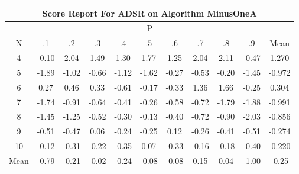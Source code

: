 \documentclass[11pt,a4paper]{report}
\begin{document}
\begin{longtable}{ | c || c | c | c | c | c | c | c | c | c || c |}
\hline
\multicolumn{11}{|c|}{ Score Report For ADSR on Algorithm MinusOneA} \\
\hline
\multicolumn{11}{|c|}{ P } \\
\hline
N & .1 & .2 & .3 & .4 & .5 & .6 & .7 & .8 & .9 & Mean\\
 \hline
 \hline
 \endhead
  4 &  \cellcolor[HTML]{FFFFFF} -0.10 &  \cellcolor[HTML]{CFCFFF} 2.04 &  \cellcolor[HTML]{D7D7FF} 1.49 &  \cellcolor[HTML]{DFDFFF} 1.30 &  \cellcolor[HTML]{CFCFFF} 1.77 &  \cellcolor[HTML]{DFDFFF} 1.25 &  \cellcolor[HTML]{CFCFFF} 2.04 &  \cellcolor[HTML]{C7C7FF} 2.11 &  \cellcolor[HTML]{FFF7F7} -0.47 & 1.270 \\
  5 &  \cellcolor[HTML]{FFCFCF} -1.89 &  \cellcolor[HTML]{FFE7E7} -1.02 &  \cellcolor[HTML]{FFEFEF} -0.66 &  \cellcolor[HTML]{FFDFDF} -1.12 &  \cellcolor[HTML]{FFD7D7} -1.62 &  \cellcolor[HTML]{FFF7F7} -0.27 &  \cellcolor[HTML]{FFEFEF} -0.53 &  \cellcolor[HTML]{FFF7F7} -0.20 &  \cellcolor[HTML]{FFD7D7} -1.45 & -0.972 \\
  6 &  \cellcolor[HTML]{F7F7FF} 0.27 &  \cellcolor[HTML]{F7F7FF} 0.46 &  \cellcolor[HTML]{F7F7FF} 0.33 &  \cellcolor[HTML]{FFEFEF} -0.61 &  \cellcolor[HTML]{FFF7F7} -0.17 &  \cellcolor[HTML]{FFF7F7} -0.33 &  \cellcolor[HTML]{DFDFFF} 1.36 &  \cellcolor[HTML]{D7D7FF} 1.66 &  \cellcolor[HTML]{FFF7F7} -0.25 & 0.304 \\
  7 &  \cellcolor[HTML]{FFD7D7} -1.74 &  \cellcolor[HTML]{FFE7E7} -0.91 &  \cellcolor[HTML]{FFEFEF} -0.64 &  \cellcolor[HTML]{FFF7F7} -0.41 &  \cellcolor[HTML]{FFF7F7} -0.26 &  \cellcolor[HTML]{FFEFEF} -0.58 &  \cellcolor[HTML]{FFEFEF} -0.72 &  \cellcolor[HTML]{FFCFCF} -1.79 &  \cellcolor[HTML]{FFCFCF} -1.88 & -0.991 \\
  8 &  \cellcolor[HTML]{FFD7D7} -1.45 &  \cellcolor[HTML]{FFDFDF} -1.25 &  \cellcolor[HTML]{FFEFEF} -0.52 &  \cellcolor[HTML]{FFF7F7} -0.30 &  \cellcolor[HTML]{FFFFFF} -0.13 &  \cellcolor[HTML]{FFF7F7} -0.40 &  \cellcolor[HTML]{FFEFEF} -0.72 &  \cellcolor[HTML]{FFE7E7} -0.90 &  \cellcolor[HTML]{FFCFCF} -2.03 & -0.856 \\
  9 &  \cellcolor[HTML]{FFEFEF} -0.51 &  \cellcolor[HTML]{FFF7F7} -0.47 &  \cellcolor[HTML]{FFFFFF} 0.06 &  \cellcolor[HTML]{FFF7F7} -0.24 &  \cellcolor[HTML]{FFF7F7} -0.25 &  \cellcolor[HTML]{FFFFFF} 0.12 &  \cellcolor[HTML]{FFF7F7} -0.26 &  \cellcolor[HTML]{FFF7F7} -0.41 &  \cellcolor[HTML]{FFEFEF} -0.51 & -0.274 \\
  10 &  \cellcolor[HTML]{FFFFFF} -0.12 &  \cellcolor[HTML]{FFF7F7} -0.31 &  \cellcolor[HTML]{FFF7F7} -0.22 &  \cellcolor[HTML]{FFF7F7} -0.35 &  \cellcolor[HTML]{FFFFFF} 0.07 &  \cellcolor[HTML]{FFF7F7} -0.33 &  \cellcolor[HTML]{FFF7F7} -0.16 &  \cellcolor[HTML]{FFF7F7} -0.18 &  \cellcolor[HTML]{FFF7F7} -0.40 & -0.220 \\
 \hline
 \hline
Mean &  \cellcolor[HTML]{FFEFEF} -0.79 &  \cellcolor[HTML]{FFF7F7} -0.21 &  \cellcolor[HTML]{FFFFFF} -0.02 &  \cellcolor[HTML]{FFF7F7} -0.24 &  \cellcolor[HTML]{FFFFFF} -0.08 &  \cellcolor[HTML]{FFFFFF} -0.08 &  \cellcolor[HTML]{FFFFFF} 0.15 &  \cellcolor[HTML]{FFFFFF} 0.04 &  \cellcolor[HTML]{FFE7E7} -1.00 &  \cellcolor[HTML]{FFF7F7} -0.25
\end{longtable}
\end{document}

